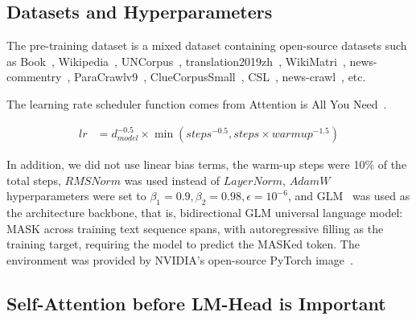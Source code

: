 \documentclass{article}
\theoremstyle{plain}
\theoremstyle{definition}
\theoremstyle{remark}
\begin{document}
\subsection{Datasets and Hyperparameters}
The pre-training dataset is a mixed dataset containing open-source datasets such as Book~\cite{bookcrossing_dataset}, Wikipedia~\cite{wikipedia_dataset}, UNCorpus~\cite{uncorpus_dataset}, translation2019zh~\cite{translation2019zh_dataset}, WikiMatri~\cite{wikimatri_dataset}, news-commentry~\cite{newscommentary_dataset}, ParaCrawlv9~\cite{paracrawl_dataset}, ClueCorpusSmall~\cite{cluecorpusSmall_dataset}, CSL~\cite{li-etal-2022-csl}, news-crawl~\cite{newscrawl_dataset}, etc.

The learning rate scheduler function comes from Attention is All You Need~\cite{wolf-etal-2020-transformers}.

\begin{equation}
\begin{aligned}
   lr &= d_{model}^{-0.5} \times \min(steps^{-0.5}, steps \times warmup^{-1.5})
\end{aligned}
\end{equation}

In addition, we did not use linear bias terms, the warm-up steps were 10\% of the total steps, $RMSNorm$ was used instead of $LayerNorm$, $AdamW$ hyperparameters were set to $\beta_1 = 0.9, \beta_2 = 0.98, \epsilon = 10^{-6}$, and GLM~\cite{du2022glm} was used as the architecture backbone, that is, bidirectional GLM universal language model: MASK across training text sequence spans, with autoregressive filling as the training target, requiring the model to predict the MASKed token. The environment was provided by NVIDIA's open-source PyTorch image~\cite{pytorch}.


\subsection{Self-Attention before LM-Head is Important}
\label{sec:Self-Attention_before_LM-Head_is_Important}
\end{document}

